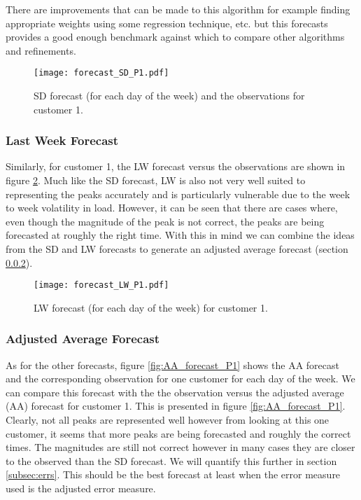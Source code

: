 \documentclass[a4paper]{article}
\begin{document}
There are improvements that can be made to this algorithm for example finding appropriate weights using some regression technique, etc. but this forecasts provides a good enough benchmark against which to compare other algorithms and refinements.


\begin{figure}
\centering
\texttt{[image: forecast\_SD\_P1.pdf]}
\caption{SD forecast (for each day of the week) and the observations for customer 1.}
\label{fig:SDforecast} 
\end{figure}

\subsubsection{Last Week Forecast} \label{subsubsec:LW_res}
Similarly, for customer 1, the LW forecast versus the observations are shown in figure \ref{fig:LW_forecast_P1}. Much like the SD forecast, LW is also not very well suited to representing the peaks accurately and is particularly vulnerable due to the week to week volatility in load. However, it can be seen that there are cases where, even though the magnitude of the peak is not correct, the peaks are being forecasted at roughly the right time. With this in mind we can combine the ideas from the SD and LW forecasts to generate an adjusted average forecast (section \ref{subsubsec:AA_res}).

\begin{figure}
\texttt{[image: forecast\_LW\_P1.pdf]}
\caption{LW forecast (for each day of the week) for customer 1.}
\label{fig:LW_forecast_P1} 
\end{figure}

\subsubsection{Adjusted Average Forecast} \label{subsubsec:AA_res}
As for the other forecasts, figure \ref{fig:AA_forecast_P1} shows the AA forecast and the corresponding observation for one customer for each day of the week. We can compare this forecast with the the observation versus the adjusted average (AA) forecast for customer 1. This is presented in figure \ref{fig:AA_forecast_P1}. Clearly, not all peaks are represented well however from looking at this one customer, it seems that more peaks are being forecasted and roughly the correct times. The magnitudes are still not correct however in many cases they are closer to the observed than the SD forecast. We will quantify this further in section \ref{subsec:errs}. This should be the best forecast at least when the error measure used is the adjusted error measure.
\end{document}
